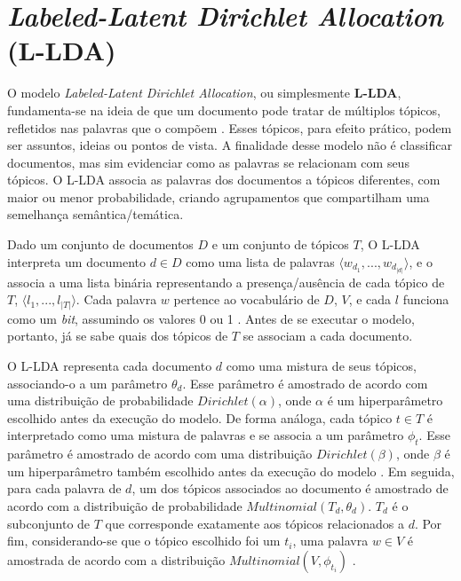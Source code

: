 
\section{\emph{Labeled-Latent Dirichlet Allocation} (L-LDA)}
\label{subsection:LDA}


O modelo \emph{Labeled-Latent Dirichlet Allocation}, ou simplesmente \textbf{L-LDA}, fundamenta-se na ideia de que um documento pode tratar de múltiplos tópicos, refletidos nas palavras que o compõem \cite{pnas}. Esses tópicos, para efeito prático, podem ser assuntos, ideias ou pontos de vista. A finalidade desse modelo não é classificar documentos, mas sim evidenciar como as palavras se relacionam com seus tópicos. O L-LDA associa as palavras dos documentos a tópicos diferentes, com maior ou menor probabilidade, criando agrupamentos que compartilham uma semelhança semântica/temática. 

Dado um conjunto de documentos \ensuremath{D} e um conjunto de tópicos \ensuremath{T}, O L-LDA interpreta um documento \ensuremath{d \in D} como uma lista de palavras \ensuremath{\langle w_{d_1}, ..., w_{d_{|d|}} \rangle}, e o associa a uma lista binária representando a presença/ausência de cada tópico de \ensuremath{T}, \ensuremath{\langle l_1, ..., l_{|T|} \rangle}. Cada palavra \ensuremath{w} pertence ao vocabulário de \ensuremath{D}, \ensuremath{V}, e cada \ensuremath{l} funciona como um \emph{bit}, assumindo os valores 0 ou 1 \cite{llda}. Antes de se executar o modelo, portanto, já se sabe quais dos tópicos de \ensuremath{T} se associam a cada documento. 


O L-LDA representa cada documento \ensuremath{d} como uma mistura de seus tópicos, associando-o a um parâmetro \ensuremath{\theta_d}. Esse parâmetro é amostrado de acordo com uma distribuição de probabilidade \ensuremath{Dirichlet(\alpha)}, onde \ensuremath{\alpha} é um hiperparâmetro escolhido antes da execução do modelo. De forma análoga, cada tópico \ensuremath{t \in T} é interpretado como uma mistura de palavras e se associa a um parâmetro \ensuremath{\phi_t}. Esse parâmetro é amostrado de acordo com uma distribuição \ensuremath{Dirichlet(\beta)}, onde \ensuremath{\beta} é um hiperparâmetro também escolhido antes da execução do modelo \cite{pnas}. Em seguida, para cada palavra de \ensuremath{d}, um dos tópicos associados ao documento é amostrado de acordo com a distribuição de probabilidade \ensuremath{Multinomial(T_d, \theta_d)}. \ensuremath{T_d} é o subconjunto de \ensuremath{T} que corresponde exatamente aos tópicos relacionados a \ensuremath{d}. Por fim, considerando-se que o tópico escolhido foi um \ensuremath{t_i}, uma palavra \ensuremath{w \in V} é amostrada de acordo com a distribuição \ensuremath{Multinomial(V, \phi_{t_i})} \cite{blei}.

